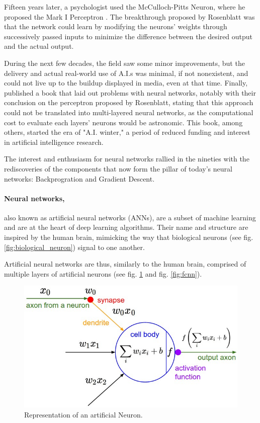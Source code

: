 Fifteen years later, a psychologist used the McCulloch-Pitts Neuron, where he
proposed the Mark I Perceptron \cite{brain_perceptron_1958}. The breakthrough
proposed by Rosenblatt was that the network could learn by modifying the
neurons' weights through successively passed inputs to minimize the difference
between the desired output and the actual output.

During the next few decades, the field saw some minor improvements, but the
delivery and actual real-world use of A.I.s was minimal, if not nonexistent, and
could not live up to the buildup displayed in media, even at that time. Finally,
\cite{minsky_perceptrons_1969} published a book that laid out problems with
neural networks, notably with their conclusion on the perceptron proposed by
Rosenblatt, stating that this approach could not be translated into
multi-layered neural networks, as the computational cost to evaluate each
layers' neurons would be astronomic. This book, among others, started the era of
"A.I. winter," a period of reduced funding and interest in artificial
intelligence research.

The interest and enthusiasm for neural networks rallied in the nineties with the
rediscoveries of the components that now form the pillar of today's neural
networks: Backprogration and Gradient Descent.


\paragraph{Neural networks,} also known as artificial neural networks (ANNs),
are a subset of machine learning and are at the heart of deep learning
algorithms. Their name and structure are inspired by the human brain, mimicking
the way that biological neurons (see fig. \ref{fig:biological_neuron}) signal to
one another.

Artificial neural networks are thus, similarly to the human brain, comprised of
multiple layers of artificial neurons (see fig. \ref{fig:artificial_neuron} and
fig. \ref{fig:fcnn}).

\begin{figure}[ht]
    \includegraphics[clip,width=1\columnwidth]{Figures/related/artificial_neuron.jpeg}
    \caption{ Representation of an artificial Neuron. }
    \label{fig:artificial_neuron}
\end{figure}

